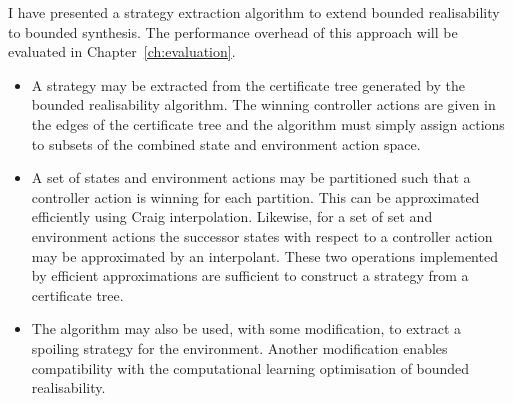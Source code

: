 I have presented a strategy extraction algorithm to extend bounded realisability to bounded synthesis. The performance overhead of this approach will be evaluated in Chapter~\ref{ch:evaluation}.

\begin{itemize}
    \item A strategy may be extracted from the certificate tree generated by the bounded realisability algorithm. The winning controller actions are given in the edges of the certificate tree and the algorithm must simply assign actions to subsets of the combined state and environment action space.

    \item A set of states and environment actions may be partitioned such that a controller action is winning for each partition. This can be approximated efficiently using Craig interpolation.  Likewise, for a set of set and environment actions the successor states with respect to a controller action may be approximated by an interpolant. These two operations implemented by efficient approximations are sufficient to construct a strategy from a certificate tree.

    \item The algorithm may also be used, with some modification, to extract a spoiling strategy for the environment. Another modification enables compatibility with the computational learning optimisation of bounded realisability.

\end{itemize}

